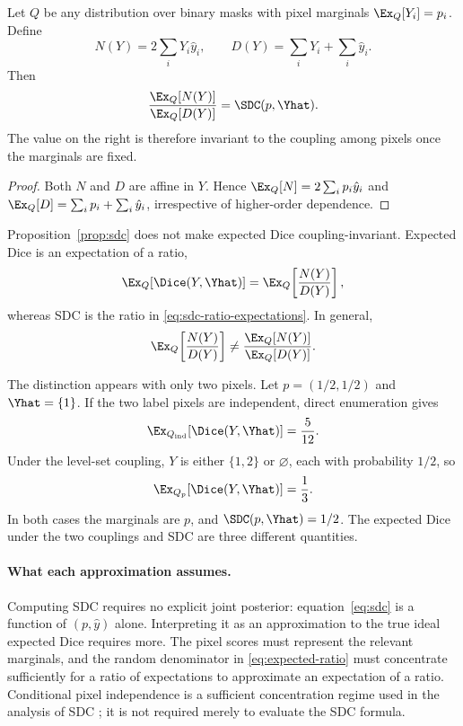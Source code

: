 \begin{proposition}\label{prop:sdc}
Let $Q$ be any distribution over binary masks with pixel marginals
$\Ex_Q[Y_i]=p_i$. Define
\begin{equation*}
  N(Y)=2\sum_iY_i\hat y_i,
  \qquad
  D(Y)=\sum_iY_i+\sum_i\hat y_i.
\end{equation*}
Then
\begin{equation}\label{eq:sdc-ratio-expectations}
  \frac{\Ex_Q[N(Y)]}{\Ex_Q[D(Y)]}
  =\SDC(p,\Yhat).
\end{equation}
The value on the right is therefore invariant to the coupling among pixels once the
marginals are fixed.
\end{proposition}
\begin{proof}
Both $N$ and $D$ are affine in $Y$. Hence
$\Ex_Q[N]=2\sum_i p_i\hat y_i$ and
$\Ex_Q[D]=\sum_i p_i+\sum_i\hat y_i$, irrespective of higher-order dependence.
\end{proof}

Proposition~\ref{prop:sdc} does not make expected Dice coupling-invariant. Expected
Dice is an expectation of a ratio,
\begin{equation}\label{eq:expected-ratio}
  \Ex_Q[\Dice(Y,\Yhat)]
  =\Ex_Q\!\left[\frac{N(Y)}{D(Y)}\right],
\end{equation}
whereas SDC is the ratio in \eqref{eq:sdc-ratio-expectations}. In general,
\begin{equation}\label{eq:ratio-noncommute}
  \Ex_Q\!\left[\frac{N(Y)}{D(Y)}\right]
  \neq
  \frac{\Ex_Q[N(Y)]}{\Ex_Q[D(Y)]}.
\end{equation}

The distinction appears with only two pixels. Let
$p=(1/2,1/2)$ and $\Yhat=\{1\}$. If the two label pixels are independent, direct
enumeration gives
\begin{equation*}
  \Ex_{Q_{\mathrm{ind}}}[\Dice(Y,\Yhat)]=\frac{5}{12}.
\end{equation*}
Under the level-set coupling, $Y$ is either $\{1,2\}$ or $\varnothing$, each with
probability $1/2$, so
\begin{equation*}
  \Ex_{Q_p}[\Dice(Y,\Yhat)]=\frac13.
\end{equation*}
In both cases the marginals are $p$, and
$\SDC(p,\Yhat)=1/2$. The expected Dice under the two couplings and SDC are three
different quantities.

\paragraph{What each approximation assumes.}
Computing SDC requires no explicit joint posterior: equation~\eqref{eq:sdc} is a
function of $(p,\hat y)$ alone. Interpreting it as an approximation to the true ideal
expected Dice requires more. The pixel scores must represent the relevant marginals,
and the random denominator in \eqref{eq:expected-ratio} must concentrate sufficiently
for a ratio of expectations to approximate an expectation of a ratio. Conditional
pixel independence is a sufficient concentration regime used in the analysis of SDC
\cite{sdc}; it is not required merely to evaluate the SDC formula.

